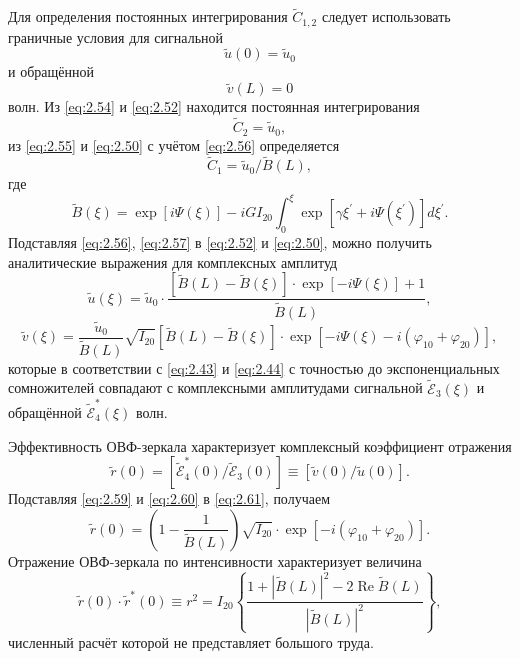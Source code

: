 Для определения постоянных интегрирования $\tilde{C}_{1,2}$ следует использовать граничные условия для сигнальной
\begin{equation}
	\label{eq:2.54}
	\tilde{u}(0) = \tilde{u}_0
\end{equation}
и обращённой
\begin{equation}
	\label{eq:2.55}
	\tilde{v}(L) = 0
\end{equation}
волн. Из \eqref{eq:2.54} и \eqref{eq:2.52} находится постоянная интегрирования
\begin{equation}
	\label{eq:2.56}
	\tilde{C}_2 = \tilde{u}_0,
\end{equation}
из \eqref{eq:2.55} и \eqref{eq:2.50} с учётом \eqref{eq:2.56} определяется
\begin{equation}
	\label{eq:2.57}
	\tilde{C}_1 = \tilde{u}_0 / \tilde{B}(L),
\end{equation}
где
\begin{equation}
	\label{eq:2.58}
	\tilde{B}(\xi)=\exp [i \Psi(\xi)]-i G I_{20} \int_{0}^{\xi} \exp \left[\gamma \xi^{\prime}+i \Psi\left(\xi^{\prime}\right)\right] d \xi^{\prime}.
\end{equation}
Подставляя \eqref{eq:2.56}, \eqref{eq:2.57} в \eqref{eq:2.52} и \eqref{eq:2.50}, можно получить аналитические выражения
для комплексных амплитуд
\begin{equation}
	\label{eq:2.59}
	\tilde{u}(\xi)=\tilde{u}_{0} \cdot \frac{\left[ \tilde{B}(L)-\tilde{B}(\xi)\right] \cdot \exp [-i \Psi(\xi)]+1}{\tilde{B}(L)},
\end{equation}
\begin{equation}
	\label{eq:2.60}
	\tilde{v}(\xi)=\frac{\tilde{u}_{0}}{\tilde{B}(L)} \sqrt{I_{20}}[\tilde{B}(L)-\tilde{B}(\xi)] \cdot \exp \left[-i \Psi(\xi)-i\left(\varphi_{10}+\varphi_{20}\right)\right],
\end{equation}
которые в соответствии с \eqref{eq:2.43} и \eqref{eq:2.44} с точностью до экспоненциальных сомножителей совпадают с комплексными амплитудами сигнальной $\tilde{\mathcal{E}}_3(\xi)$ и обращённой $\tilde{\mathcal{E}}_4^*(\xi)$ волн.

Эффективность ОВФ-зеркала характеризует комплексный коэффициент
отражения
\begin{equation}
	\label{eq:2.61}
	\tilde{r}(0)=\left[\tilde{\mathcal{E}}_{4}^*(0) / \tilde{\mathcal{E}}_{3}(0)\right] \equiv[\tilde{v}(0) / \tilde{u}(0)].
\end{equation}
Подставляя \eqref{eq:2.59} и \eqref{eq:2.60} в \eqref{eq:2.61}, получаем
\begin{equation}
	\label{eq:2.62}
	\tilde{r}(0)=\left(1-\frac{1}{\tilde{B}(L)}\right) \sqrt{I_{20}} \cdot \exp \left[-i\left(\varphi_{10}+\varphi_{20}\right)\right].
\end{equation}
Отражение ОВФ-зеркала по интенсивности характеризует величина
\begin{equation}
	\label{eq:2.63}
	\tilde{r}(0) \cdot \tilde{r}^{*}(0) \equiv r^{2}=I_{20}\left\{
	\frac{1+|\tilde{B}(L)|^{2}-2 \operatorname{Re} \tilde{B}(L)}{|\tilde{B}(L)|^{2}}
	\right\},
\end{equation}
численный расчёт которой не представляет большого труда.

